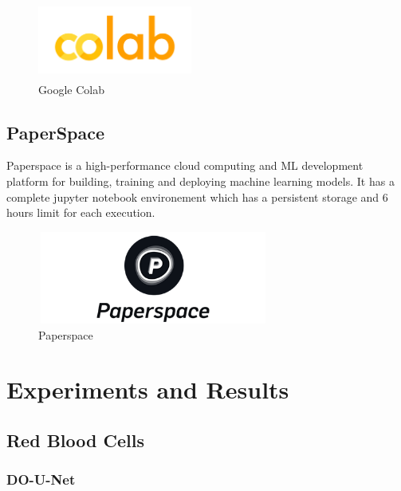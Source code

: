 \begin{figure}[H]
\centering
  \vspace{-0.1in}
    \centerline{\includegraphics[width = 2in, height = 1in]{../images/colab.png}}
    \caption{Google Colab}
    \label{Google Colab}
\end{figure}

\subsection{PaperSpace}
Paperspace is a high-performance cloud computing and ML development platform for building, training and deploying machine learning models. It has a complete jupyter notebook environement which has a persistent storage and 6 hours limit for each execution.

\begin{figure}[H]
    \centering
      \vspace{-0.1in}
        \centerline{\includegraphics[width = 3in, height = 1.2in]{../images/paperspace.png}}
        \caption{Paperspace}
        \label{Paperspace}
    \end{figure}

\section{Experiments and Results}

\subsection{Red Blood Cells}
\subsubsection{DO-U-Net}

